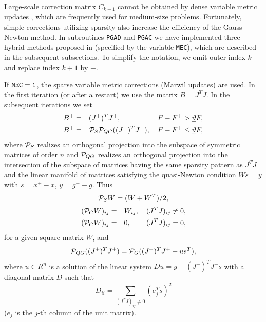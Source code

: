 \documentclass{esub2acm}
\newcommand{\beq}{\begin{eqnarray*}}
\newcommand{\eeq}{\end{eqnarray*}}
\begin{document}
Large-scale correction matrix $C_{k+1}$ cannot be obtained
by dense variable metric updates \cite{abf1}, which are frequently used
for medium-size problems. Fortunately, simple corrections
utilizing sparsity also increase the efficiency of the Gauss-Newton
method. In subroutines {\tt PGAD} and {\tt PGAC} we have implemented three
hybrid methods proposed in \cite{luk2} (specified by the variable
{\tt MEC}), which are described in the subsequent subsections. To simplify
the notation, we omit outer index $k$ and replace index $k+1$ by $+$.

\vspace{5mm}


\vspace{3mm}

\noindent If ${\tt MEC=1}$, the sparse variable metric corrections (Marwil updates)
are used. In the first iteration (or after a restart) we
use the matrix $B = J^T J$. In the subsequent iterations we set
%
\beq
B^+ & = & (J^+)^T J^+, \hspace{18mm} F - F^+ > \underline{\vartheta} F, \nonumber \\
B^+ & = & {\cal P}_S {\cal P}_{QG} ((J^+)^T J^+), \quad
F - F^+ \leq \underline{\vartheta} F, \label{5.3}
\eeq
%
where ${\cal P}_S$ realizes an orthogonal projection into the subspace of symmetric
matrices of order $n$ and ${\cal P}_{QG}$ realizes an orthogonal projection into the
intersection of the subspace of matrices having the same sparsity pattern as $J^T J$
and the linear manifold of matrices satisfying the quasi-Newton
condition $W s = y$ with $s = x^+ - x$, $y = g^+ - g$. Thus
%
$${\cal P}_S W = (W + W^T)/2,$$
%
\begin{eqnarray*}
({\cal P}_G W)_{ij} & = & W_{ij}, \quad (J^TJ)_{ij} \neq 0, \\
({\cal P}_G W)_{ij} & = & 0, \quad \quad \, (J^TJ)_{ij} = 0,
\end{eqnarray*}
%
for a given square matrix $W$, and
%
$${\cal P}_{QG} ((J^+)^T J^+) = {\cal P}_G ((J^+)^T J^+ + u s^T),$$
%
where $u \in R^n$ is a solution of the linear system $D u = y - (J^+)^T J^+ s$
with a diagonal matrix $D$ such that
%
$$D_{ii} = \sum_{(J^TJ)_{ij} \neq 0} (e_j^T s)^2$$
%
($e_j$ is the $j$-th column of the unit matrix).

\vspace{5mm}
\end{document}
